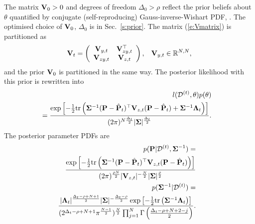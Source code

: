 The matrix $\mathbf{V}_{0} >0$ and degrees of freedom $\Delta_{0}>\rho$ reflect the prior beliefs about $\theta$ quantified by conjugate (self-reproducing) Gauss-inverse-Wishart PDF, \cite{Pet:81,Zel:76}. The optimised choice of $\mathbf{V}_{0}$,  $\Delta_{0}$ is in Sec.\ \ref{s:prior}.
 The matrix (\ref{e:Vmatrix}) is partitioned as
\begin{equation}
\label{e:Vpartition}
    \mathbf{V}_{t} = \left(\begin{array}{cc}
        \mathbf{V}_{y,t} & \mathbf{V}_{zy,t}^{\top} \\
        \mathbf{V}_{zy,t} & \mathbf{V}_{z,t}
    \end{array}\right),\hspace*{2ex}\mathbf{V}_{y,t}\in \mathbb{R}^{N,N},
\end{equation}
and the prior $\mathbf{V}_{0}$ is partitioned in the same way. The posterior likelihood with this prior is rewritten into
\begin{eqnarray}
\label{e:likelihood}
&&\hspace*{-4ex}l(\mathcal{D}^{(t)},\theta)p(\theta)\\
\nonumber
&&\hspace*{-4ex}=\frac{\exp\left[-\frac{1}{2}\text{tr}\left(\mat{\Sigma}^{-1} (\mat{P} - \hat{\mat{P}}_{t})^{\top}\mat{V}_{z,t}(\mat{P} - \hat{\mat{P}}_{t}) + \mat{\Sigma}^{-1} \mat{\Lambda}_{t}\right)\right]}{(2\pi)^{N\frac{\Delta_{t}}{2}} |\mat{\Sigma}|^{\frac{\Delta_{t}}{2}}}.
\end{eqnarray}
The posterior parameter PDFs are
\begin{eqnarray}
\nonumber
&&\hspace*{-4ex} p(\mat{P}|\mathcal{D}^{(t)}, \mat{\Sigma}^{-1})= \\
\nonumber
&&\hspace*{-4ex}\frac{\exp\left[-\frac{1}{2}\text{tr}\left(\mat{\Sigma}^{-1}(\mat{P} - \hat{\mat{P}}_{t})^{\top}\mat{V}_{z,t}(\mat{P}-\hat{\mat{P}}_{t})\right)\right]}{(2\pi)^{\frac{\rho N}{2}}|\mat{V}_{z,t}|^{-\frac{N}{2}}|\mat{\Sigma}|^{\frac{\rho}{2}}}\\
\label{e:PDFSigma}
&&\hspace*{-4ex}p(\mat{\Sigma}^{-1}|\mathcal{D}^{(t)})=\\
\nonumber
&&\hspace*{-4ex}\frac{|\mat{\Lambda}_{t}|^{\frac{\Delta_{t}-\rho+N+1}{2}}|\mat{\Sigma}|^{-\frac{\Delta_{t}-\rho}{2}}
\exp\left[-\frac{1}{2}\text{tr}\left(\mat{\Sigma}^{-1}\mat{\Lambda}_{t}\right)\right]}
{(2^{\Delta_{t}-\rho+N+1}\pi^{\frac{N-1}{2}})^{\frac{N}{2}}\prod_{j=1}^N\Gamma\left(\frac{\Delta_{t}-\rho+N+2-j}{2}\right)}.
\end{eqnarray}
